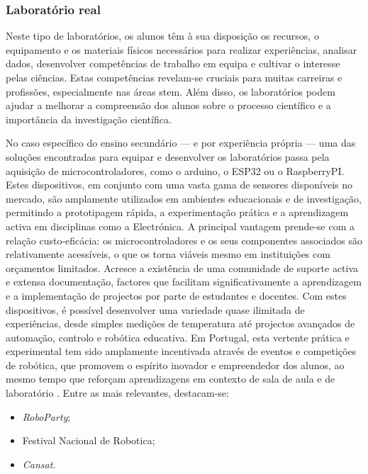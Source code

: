 \subsubsection{Laboratório real}
Neste tipo de laboratórios, os alunos têm à sua disposição os recursos, o equipamento e os materiais físicos necessários para realizar experiências, analisar dados, desenvolver competências de trabalho em equipa e cultivar o interesse pelas ciências. Estas competências revelam-se cruciais para muitas carreiras e profissões, especialmente nas áreas \acrshort{stem}. Além disso, os laboratórios podem ajudar a melhorar a compreensão dos alunos sobre o processo científico e a importância da investigação científica.

No caso específico do ensino secundário — e por experiência própria — uma das soluções encontradas para equipar e desenvolver os laboratórios passa pela aquisição de \acrshort{microcontroladores}, como o \gls{arduino}, o \gls{ESP32} ou o \gls{RaspberryPI}. Estes dispositivos, em conjunto com uma vasta gama de sensores disponíveis no mercado, são amplamente utilizados em ambientes educacionais e de investigação, permitindo a prototipagem rápida, a experimentação prática e a aprendizagem activa em disciplinas como a Electrónica. A principal vantagem prende-se com a relação custo-eficácia: os microcontroladores e os seus componentes associados são relativamente acessíveis, o que os torna viáveis mesmo em instituições com orçamentos limitados. Acresce a existência de uma comunidade de suporte activa e extensa documentação, factores que facilitam significativamente a aprendizagem e a implementação de projectos por parte de estudantes e docentes. Com estes dispositivos, é possível desenvolver uma variedade quase ilimitada de experiências, desde simples medições de temperatura até projectos avançados de automação, controlo e robótica educativa.
Em Portugal, esta vertente prática e experimental tem sido amplamente incentivada através de eventos e competições de robótica, que promovem o espírito inovador e empreendedor dos alunos, ao mesmo tempo que reforçam aprendizagens em contexto de sala de aula e de laboratório \cite{roboparty, fnr, cansat}. Entre as mais relevantes, destacam-se:
\begin{itemize}
    \item \textit{RoboParty};
    \item Festival Nacional de Robotica;
    \item \textit{Cansat}.
\end{itemize}

